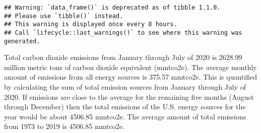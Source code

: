 \documentclass[
]{article}
\newenvironment{Shaded}{\begin{snugshade}}{\end{snugshade}}
\newcommand{\CommentTok}[1]{\textcolor[rgb]{0.56,0.35,0.01}{\textit{#1}}}
\newcommand{\DataTypeTok}[1]{\textcolor[rgb]{0.13,0.29,0.53}{#1}}
\newcommand{\DecValTok}[1]{\textcolor[rgb]{0.00,0.00,0.81}{#1}}
\newcommand{\FloatTok}[1]{\textcolor[rgb]{0.00,0.00,0.81}{#1}}
\newcommand{\KeywordTok}[1]{\textcolor[rgb]{0.13,0.29,0.53}{\textbf{#1}}}
\newcommand{\NormalTok}[1]{#1}
\newcommand{\OperatorTok}[1]{\textcolor[rgb]{0.81,0.36,0.00}{\textbf{#1}}}
\newcommand{\StringTok}[1]{\textcolor[rgb]{0.31,0.60,0.02}{#1}}
\begin{document}
\begin{verbatim}
## Warning: `data_frame()` is deprecated as of tibble 1.1.0.
## Please use `tibble()` instead.
## This warning is displayed once every 8 hours.
## Call `lifecycle::last_warnings()` to see where this warning was generated.
\end{verbatim}

\begin{Shaded}
\end{Shaded}

Total carbon dioxide emissions from January through July of 2020 is
2628.99 million metric tons of carbon dioxide equivalent (mmtco2e). The
average monthly amount of emissions from all energy sources is 375.57
mmtco2e. This is quantified by calculating the sum of total emission
sources from January through July of 2020. If emissions are close to the
average for the remaining five months (August through December) then the
total emissions of the U.S. energy sources for the year would be about
4506.85 mmtco2e. The average amount of total emissions from 1973 to 2019
is 4506.85 mmtco2e.
\end{document}
